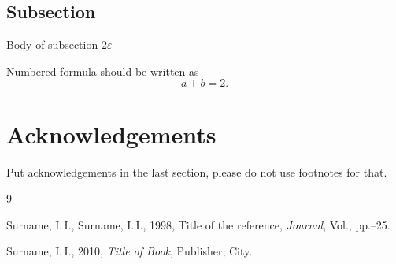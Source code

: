 \documentclass{procDDs}
\begin{document}
\begin{table}[h!]
	\label{table:desc6}
\end{table}
 
\subsection{Subsection}

Body of subsection $2\varepsilon$

Numbered formula should be written as
\begin{equation}\label{key}                       %
a+b=2.                                         %
\end{equation}


\section*{Acknowledgements}

Put acknowledgements in the last section, please do not use footnotes for that.


\begin {thebibliography}{9}

 Surname, I.\,I., Surname, I.\,I., 1998,
            Title of the reference,
            \emph{Journal}, Vol., pp.--25.

 Surname, I.\,I., 2010, \textit{Title of Book}, Publisher, City.

\end{thebibliography}
\end{document}
